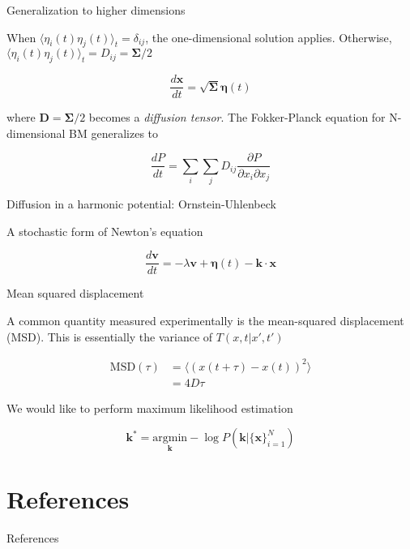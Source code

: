 \documentclass{beamer}					%
\begin{document}
\begin{frame}{Generalization to higher dimensions}

When $\langle \eta_{i}(t)\eta_{j}(t)\rangle_{t} = \delta_{ij}$, the one-dimensional solution applies. Otherwise, $\langle \eta_{i}(t)\eta_{j}(t)\rangle_{t} = D_{ij} = \bm{\Sigma}/2$

\begin{equation*}
\frac{d\bm{x}}{dt} = \sqrt{\bm{\Sigma}}\bm{\eta}(t) 
\end{equation*}

where $\bm{D} = \bm{\Sigma}/2$ becomes a \emph{diffusion tensor}. The Fokker-Planck equation for N-dimensional BM generalizes to 

\begin{equation*}
\frac{dP}{dt} = \sum_{i}\sum_{j}D_{ij}\frac{\partial P}{\partial x_{i}\partial x_{j}}
\end{equation*}

\end{frame}

\begin{frame}{Diffusion in a harmonic potential: Ornstein-Uhlenbeck}

A stochastic form of Newton's equation

\begin{equation*}
\frac{d\bm{v}}{dt} = -\lambda \bm{v} + \bm{\eta}(t) - \bm{k}\cdot \bm{x}
\end{equation*}

\end{frame}

\begin{frame}{Mean squared displacement}

A common quantity measured experimentally is the mean-squared displacement (MSD). This is essentially the variance of $T(x,t|x',t')$

\begin{align*}
\mathrm{MSD}(\tau) &= \langle \left(x(t+\tau) - x(t)\right)^{2}\rangle\\
&=  4D\tau
\end{align*}

\end{frame}

\begin{frame}
We would like to perform maximum likelihood estimation

\begin{equation*}
\bm{k}^{*} = \underset{\bm{k}}{\mathrm{argmin}} -\log P(\bm{k}|\{\bm{x}\}_{i=1}^{N})
\end{equation*}

\end{frame}


\section{References}

\begin{frame}[allowframebreaks]{References}
	\tiny
	
\end{frame}
\end{document}
